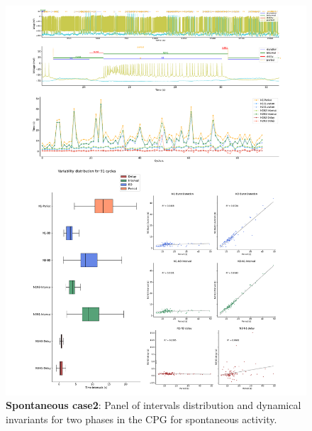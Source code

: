 \begin{figure}[htbp]
	\centering
	\includegraphics[width=1.1\textwidth]{./invariants/data/SUSSEX/prep2/images/2phases/panel_with_intervals.pdf}
	\caption{\textbf{Spontaneous case2}: Panel of intervals distribution and dynamical invariants for two phases in the CPG for spontaneous activity.}
	\label{fig:prep2 2phase invariants}
\end{figure}

